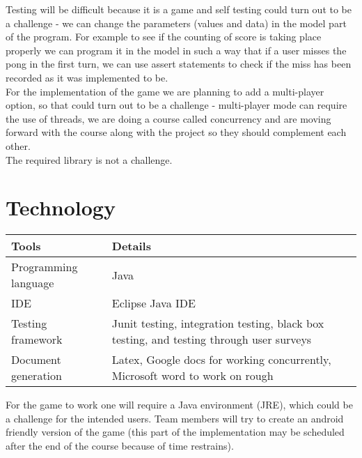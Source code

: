 \documentclass{article}
\begin{document}
Testing will be difficult because it is a game and self testing could turn out to be a challenge - we can change the parameters (values and data) in the model part of the program. For example to see if the counting of score is taking place properly we can program it in the model in such a way that if a user misses the pong in the first turn, we can use assert statements to check if the miss has been recorded as it was implemented to be.\\

For the implementation of the game we are planning to add a multi-player option, so that could turn out to be a challenge - multi-player mode can require the use of threads, we are doing a course called concurrency and are moving forward with the course along with the project so they should complement each other.\\

The required library is not a challenge.

\section {Technology}

\begin{tabular}{|p{5cm}|p{8cm}|}
\hline
\textbf{Tools}    & \textbf{Details}                                                                                                                                                                                                                                                                                                                                                                                                                                \\\hline
Programming language       & Java\\\hline
IDE      & Eclipse Java IDE\\\hline
Testing framework       & Junit testing, integration testing, black box testing, and testing through user surveys \\\hline
Document generation   & Latex, Google docs for working concurrently, Microsoft word to work on rough \\\hline
\end{tabular}

For the game to work one will require a Java environment (JRE), which could be a challenge for the intended users. Team members will try to create an android friendly version of the game (this part of the implementation may be scheduled after the end of the course because of time restrains). \\
\end{document}
